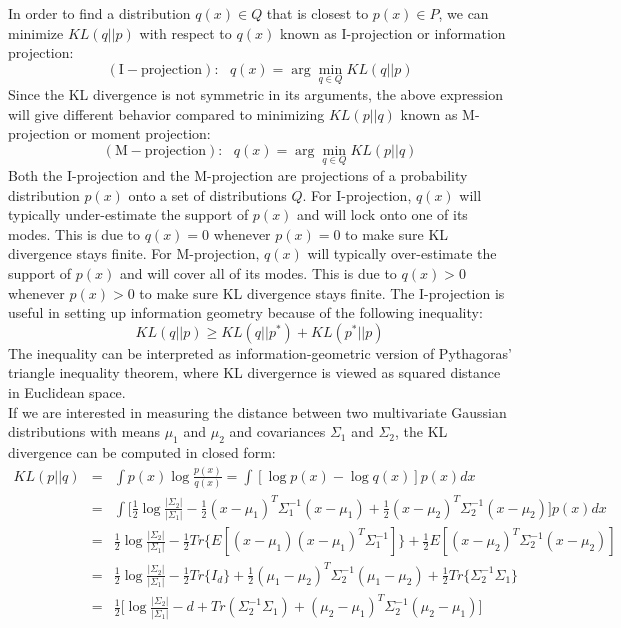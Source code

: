 In order to find a distribution $q(x) \in Q$ that is closest to $p(x) \in P$, we can minimize $KL(q||p)$ with respect to $q(x)$ known as I-projection or information projection:
\begin{equation}
    (\mathrm{I-projection}): ~~~ q(x) = \arg \min_{q \in Q} KL(q||p)
\end{equation}
Since the KL divergence is not symmetric in its arguments, the above expression will give different behavior compared to minimizing $KL(p||q)$ known as M-projection or moment projection:
\begin{equation}
    (\mathrm{M-projection}): ~~~ q(x) = \arg \min_{q \in Q} KL(p||q)
\end{equation}
Both the I-projection and the M-projection are projections of a probability distribution $p(x)$ onto a set of distributions $Q$. For I-projection, $q(x)$ will typically under-estimate the support of $p(x)$ and will lock onto one of its modes. This is due to $q(x)=0$ whenever $p(x)=0$ to make sure KL divergence stays finite. For M-projection, $q(x)$ will typically over-estimate the support of $p(x)$ and will cover all of its modes. This is due to $q(x)>0$ whenever $p(x)>0$ to make sure KL divergence stays finite. The I-projection is useful in setting up information geometry because of the following inequality:
\begin{equation}
    KL(q||p) \geq KL(q||p^{\ast}) + KL(p^{\ast}||p)
\end{equation}
The inequality can be interpreted as information-geometric version of Pythagoras' triangle inequality theorem, where KL divergernce is viewed as squared distance in Euclidean space.\\
If we are interested in measuring the distance between two multivariate Gaussian distributions with means $\mu_1$ and $\mu_2$ and covariances $\Sigma_1$ and $\Sigma_2$, the KL divergence can be computed in closed form:
\begin{eqnarray}
    KL(p||q) &=& \int p(x) \log \frac{p(x)}{q(x)} = \int [\log p(x) - \log q(x)] p(x) dx \nonumber \\
    &=& \int \bigg[\frac{1}{2}\log\frac{|\Sigma_2|}{|\Sigma_1|}-\frac{1}{2}(x-\mu_1)^{T}\Sigma_{1}^{-1}(x-\mu_1) + \frac{1}{2}(x-\mu_2)^{T}\Sigma_{2}^{-1}(x-\mu_2)\bigg]p(x) dx \nonumber \\
    &=& \frac{1}{2}\log\frac{|\Sigma_2|}{|\Sigma_1|}-\frac{1}{2}Tr\{E[(x-\mu_1)(x-\mu_1)^{T}\Sigma_{1}^{-1}]\} + \frac{1}{2}E[(x-\mu_2)^{T}\Sigma_{2}^{-1}(x-\mu_2)] \nonumber \\
    &=& \frac{1}{2}\log\frac{|\Sigma_2|}{|\Sigma_1|}-\frac{1}{2}Tr\{I_d\}+\frac{1}{2}(\mu_1-\mu_2)^{T}\Sigma_{2}^{-1}(\mu_1 - \mu_2) + \frac{1}{2}Tr\{\Sigma_{2}^{-1}\Sigma_1\} \nonumber \\
    &=& \frac{1}{2}\bigg[\log\frac{|\Sigma_2|}{|\Sigma_1|}-d+Tr(\Sigma_{2}^{-1}\Sigma_1)+(\mu_2-\mu_1)^{T}\Sigma_{2}^{-1}(\mu_2 - \mu_1) \bigg]
\end{eqnarray}


